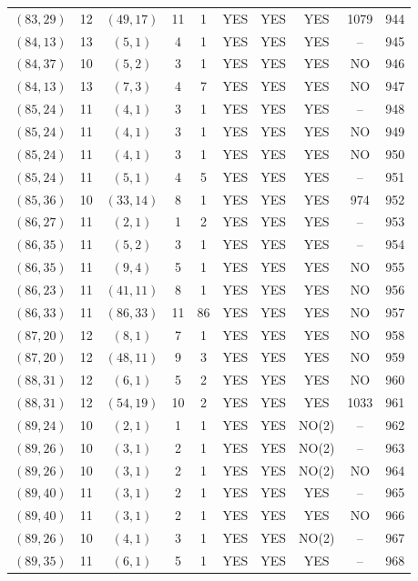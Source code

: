 \begin{longtable}{|c|c|c|c|c|c|c|c|c|c|}
$(83, 29)$ & 12 & $(49, 17)$ & 11 & 1 & YES & YES & YES & 1079 & 944\\
$(84, 13)$ & 13 & $(5, 1)$ & 4 & 1 & YES & YES & YES & -- & 945\\
$(84, 37)$ & 10 & $(5, 2)$ & 3 & 1 & YES & YES & YES & NO & 946\\
$(84, 13)$ & 13 & $(7, 3)$ & 4 & 7 & YES & YES & YES & NO & 947\\
$(85, 24)$ & 11 & $(4, 1)$ & 3 & 1 & YES & YES & YES & -- & 948\\
$(85, 24)$ & 11 & $(4, 1)$ & 3 & 1 & YES & YES & YES & NO & 949\\
$(85, 24)$ & 11 & $(4, 1)$ & 3 & 1 & YES & YES & YES & NO & 950\\
$(85, 24)$ & 11 & $(5, 1)$ & 4 & 5 & YES & YES & YES & -- & 951\\
$(85, 36)$ & 10 & $(33, 14)$ & 8 & 1 & YES & YES & YES & 974 & 952\\
$(86, 27)$ & 11 & $(2, 1)$ & 1 & 2 & YES & YES & YES & -- & 953\\
$(86, 35)$ & 11 & $(5, 2)$ & 3 & 1 & YES & YES & YES & -- & 954\\
$(86, 35)$ & 11 & $(9, 4)$ & 5 & 1 & YES & YES & YES & NO & 955\\
$(86, 23)$ & 11 & $(41, 11)$ & 8 & 1 & YES & YES & YES & NO & 956\\
$(86, 33)$ & 11 & $(86, 33)$ & 11 & 86 & YES & YES & YES & NO & 957\\
$(87, 20)$ & 12 & $(8, 1)$ & 7 & 1 & YES & YES & YES & NO & 958\\
$(87, 20)$ & 12 & $(48, 11)$ & 9 & 3 & YES & YES & YES & NO & 959\\
$(88, 31)$ & 12 & $(6, 1)$ & 5 & 2 & YES & YES & YES & NO & 960\\
$(88, 31)$ & 12 & $(54, 19)$ & 10 & 2 & YES & YES & YES & 1033 & 961\\
$(89, 24)$ & 10 & $(2, 1)$ & 1 & 1 & YES & YES & NO(2) & -- & 962\\
$(89, 26)$ & 10 & $(3, 1)$ & 2 & 1 & YES & YES & NO(2) & -- & 963\\
$(89, 26)$ & 10 & $(3, 1)$ & 2 & 1 & YES & YES & NO(2) & NO & 964\\
$(89, 40)$ & 11 & $(3, 1)$ & 2 & 1 & YES & YES & YES & -- & 965\\
$(89, 40)$ & 11 & $(3, 1)$ & 2 & 1 & YES & YES & YES & NO & 966\\
$(89, 26)$ & 10 & $(4, 1)$ & 3 & 1 & YES & YES & NO(2) & -- & 967\\
$(89, 35)$ & 11 & $(6, 1)$ & 5 & 1 & YES & YES & YES & -- & 968\\

\end{longtable}
